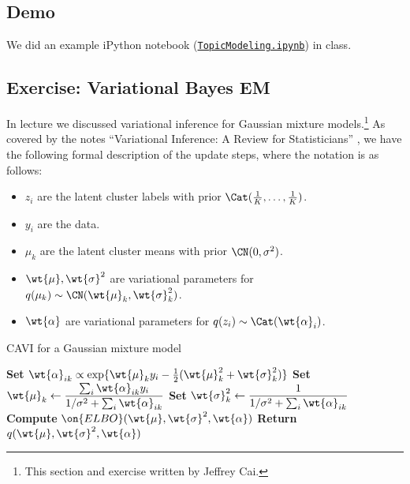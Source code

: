 \documentclass{article}
\begin{document}
\subsection{Demo}

\smallskip
We did an example iPython notebook (\href{https://github.com/harvard-ml-courses/cs281-demos/blob/master/TopicModeling.ipynb}{\texttt{TopicModeling.ipynb}}) in class.

\subsection{Exercise: Variational Bayes EM}

In lecture we discussed variational inference for Gaussian mixture models.\footnote{This section and exercise written by Jeffrey Cai.} As covered by the notes ``Variational Inference: A Review for Statisticians'' \cite{BKM17}, we have the following formal description of the update steps, where the notation is as follows:
\begin{itemize}
\item $z_i$ are the latent cluster labels with prior $\Cat(\frac{1}{K}, \dots, \frac{1}{K})$.
\item $y_i$ are the data.
\item $\mu_k$ are the latent cluster means with prior $\CN(0, \sigma^2)$.
\item $\wt{\mu}, \wt{\sigma}^2$ are variational parameters for $q(\mu_k) \sim \CN(\wt{\mu}_k, \wt{\sigma}^2_k)$.
\item $\wt{\alpha}$ are variational parameters for $q(z_i) \sim \Cat(\wt{\alpha}_i)$.
\end{itemize}

\begin{algorithm}
    \caption{CAVI for a Gaussian mixture model}
    \label{alg:cavigmm}
    \begin{algorithmic}[1]
                \State \textbf{Set} $\wt{\alpha}_{ik} \propto \exp\{ \wt{\mu}_k y_i - \frac{1}{2} (\wt{\mu}_k^2 + \wt{\sigma}_k^2) \}$
            \EndFor
                \State \textbf{Set} $\displaystyle \wt{\mu}_k \gets \frac{\sum_i \wt{\alpha}_{ik} y_i}{1/\sigma^2 + \sum_i \wt{\alpha}_{ik}}$
                \State \textbf{Set} $\displaystyle \wt{\sigma}^2_k \gets \frac{1}{1/\sigma^2 + \sum_i \wt{\alpha}_{ik}}$
            \EndFor
            \State \textbf{Compute} $\on{ELBO}(\wt{\mu}, \wt{\sigma}^2, \wt{\alpha})$
        \EndWhile
        \State \textbf{Return} $q(\wt{\mu}, \wt{\sigma}^2, \wt{\alpha})$
    \end{algorithmic}
\end{algorithm}
\end{document}

